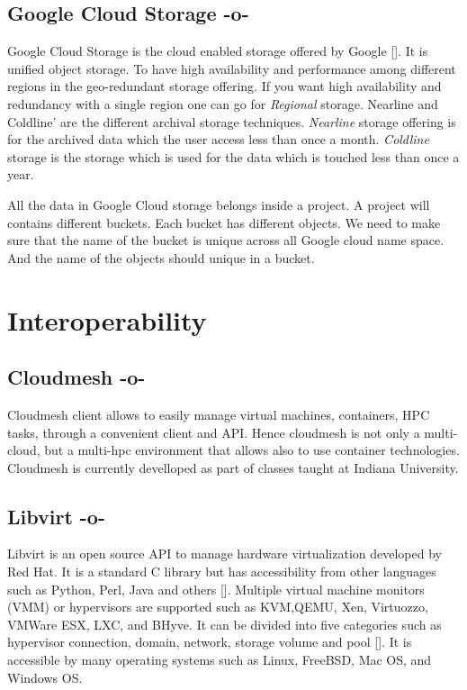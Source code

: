 \subsection{Google Cloud Storage -o-}

Google Cloud Storage is the cloud enabled storage offered by
Google [\cite{www-google-cloud-storage}]. It is unified object
storage. To have high availability and performance among different
regions in the geo-redundant storage offering. If you want high
availability and redundancy with a single region one can go for
\textit{Regional} storage. Nearline and Coldline' are the different
archival storage techniques. \textit{Nearline} storage offering is for
the archived data which the user access less than once a
month. \textit{Coldline} storage is the storage which is used for the
data which is touched less than once a year.

All the data in Google Cloud storage belongs inside a project. A
project will contains different buckets. Each bucket has different
objects. We need to make sure that the name of the bucket is unique
across all Google cloud name space. And the name of the objects should
unique in a bucket.




\section{Interoperability}


\subsection{Cloudmesh -o-}

Cloudmesh client allows to easily manage virtual machines, containers,
HPC tasks, through a convenient client and API. Hence cloudmesh is not
only a multi-cloud, but a multi-hpc environment that allows also to
use container technologies. Cloudmesh is currently develloped as part
of classes taught at Indiana University.



\subsection{Libvirt -o-}

Libvirt is an open source API to manage hardware virtualization
developed by Red Hat.  It is a standard C library but has
accessibility from other languages such as Python, Perl, Java and
others [\cite{www-libvirt}]. Multiple virtual machine monitors (VMM) or
hypervisors are supported such as KVM,QEMU, Xen, Virtuozzo, VMWare
ESX, LXC, and BHyve.  It can be divided into five categories such as
hypervisor connection, domain, network, storage volume and
pool [\cite{www-ibm}]. It is accessible by many operating systems such
as Linux, FreeBSD, Mac OS, and Windows OS.


